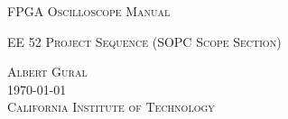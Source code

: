 ﻿%


\begin{titlepage}

\begin{center}

\vspace{4cm}

{\LARGE \textsc{FPGA Oscilloscope Manual}}\\

\vspace{0.5cm}

{\normalsize \textsc{EE 52 Project Sequence (SOPC Scope Section)}}

\vspace{7cm}

{\large \textsc{Albert Gural}}\\

\vspace{0.5cm}
\textsc{\today}\\ %


\vspace{4cm}
{\Large \textsc{California Institute of Technology}}\\

\end{center}

\end{titlepage}
